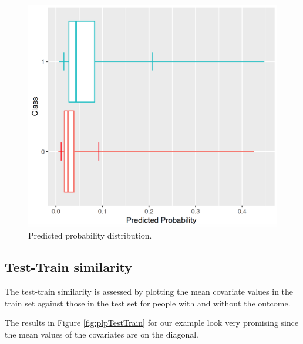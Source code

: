\documentclass[]{book}
\begin{document}
\begin{figure}

{\centering \includegraphics[width=0.9\linewidth]{images/PatientLevelPrediction/predictionDistribution} 

}

\caption{Predicted probability distribution.}\label{fig:plpPredProb}
\end{figure}

\subsection{Test-Train similarity}\label{test-train-similarity}

The test-train similarity is assessed by plotting the mean covariate
values in the train set against those in the test set for people with
and without the outcome.

The results in Figure \ref{fig:plpTestTrain} for our example look very
promising since the mean values of the covariates are on the diagonal.
\end{document}
